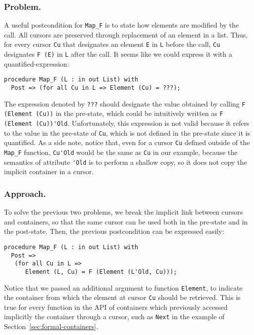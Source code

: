 \documentclass[runningheads,a4paper]{llncs}
\begin{document}
\subsubsection{Problem.}

A useful postcondition for \verb|Map_F| is to state how elements are
modified by the call. All cursors are preserved through replacement of an
element in a list. Thus, for every cursor \verb|Cu| that designates an element
\verb|E| in \verb|L| before the call, \verb|Cu| designates \verb|F (E)| in
\verb|L| after the call. It seems like we could express it with a
quantified-expression:
\begin{lstlisting}
procedure Map_F (L : in out List) with
  Post => (for all Cu in L => Element (Cu) = ???);
\end{lstlisting}

The expression denoted by \verb|???| should designate the value obtained by calling
\verb|F (Element (Cu))| in the pre-state, which could be intuitively written as
\verb|F (Element (Cu))'Old|. Unfortunately, this expression is not valid
because it refers to the value in the pre-state of \verb|Cu|, which is not
defined in the pre-state
since it is quantified.
%
As a side note, notice that, even for a cursor
\verb|Cu| defined outside of the \verb|Map_F| function, \verb|Cu'Old| would be the same as
\verb|Cu| in our example, because the semantics of attribute \verb|'Old| is to
perform a shallow copy, so it does not copy the implicit container in a cursor.


\subsubsection{Approach.}
To solve the previous two problems,
we break the implicit link between cursors and containers, so that the same cursor can be used both in
the pre-state and in the post-state. Then, the previous postcondition can be
expressed easily:
\begin{lstlisting}
procedure Map_F (L : in out List) with
  Post =>
   (for all Cu in L =>
      Element (L, Cu) = F (Element (L'Old, Cu)));
\end{lstlisting}

Notice that we passed an additional argument to function \verb|Element|, to
indicate the container from which the element at cursor \verb|Cu| should be
retrieved. This is true for every function in the API of containers which
previously accessed implicitly the container through a cursor, such as
\verb|Next| in the example of Section~\ref{sec:formal-containers}.
\end{document}

